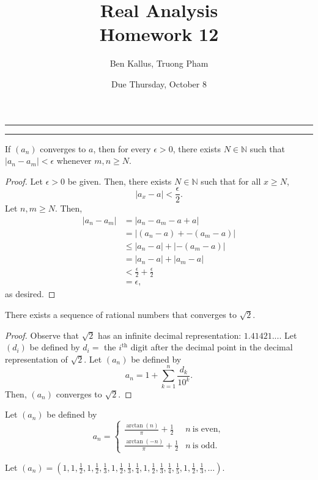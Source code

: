 \documentclass[12pt]{article}
\title{Real Analysis \\ Homework 12}
\author{Ben Kallus, Truong Pham}
\date{Due Thursday, October 8}
\begin{document}
\maketitle

\hrule
\bigskip


\bigskip
\hrule
\bigskip

 If $(a_n)$ converges to $a$, then for every $\epsilon > 0$, there exists $N \in \mathbb N$ such that $|a_n - a_m| < \epsilon$ whenever $m, n \geq N$.
\begin{proof}
    Let $\epsilon > 0$ be given. Then, there exists $N \in \mathbb N$ such that for all $x \geq N$, $$|a_x - a| < \frac\epsilon2.$$
    Let $n, m \geq N$. Then,
    \begin{align*}
        |a_n - a_m| &= |a_n - a_m - a + a| \\
                    &= |(a_n - a) + -(a_m - a)| \\
                    &\leq |a_n - a| + |-(a_m - a)| \\
                    &= |a_n - a| + |a_m - a| \\
                    &< \frac\epsilon2 + \frac\epsilon2 \\
                    &= \epsilon,
    \end{align*}
    as desired.
\end{proof}

\newpage
{} There exists a sequence of rational numbers that converges to $\sqrt2$.
\begin{proof}
    Observe that $\sqrt2$ has an infinite decimal representation: $1.41421...$. Let $(d_i)$ be defined by $d_i =$ the $i^\text{th}$ digit after the decimal point in the decimal representation of $\sqrt2$. Let $(a_n)$ be defined by $$a_n = 1 + \sum_{k=1}^n \frac{d_k}{10^k}.$$
    Then, $(a_n)$ converges to $\sqrt2$.
\end{proof}

\newpage
{}

 Let $(a_n)$ be defined by
$$a_n =
\begin{cases}
    \frac{\arctan(n)}{\pi}+\frac{1}{2} & n~\text{is even}, \\
    \frac{\arctan(-n)}{\pi}+\frac{1}{2} & n~\text{is odd}.
\end{cases}$$

\medskip
{} Let $(a_n) = (1, 1, \frac12, 1, \frac12, \frac13, 1, \frac12, \frac13, \frac14, 1, \frac12, \frac13, \frac14, \frac15, 1, \frac12, \frac13, \hdots)$.
\end{document}
